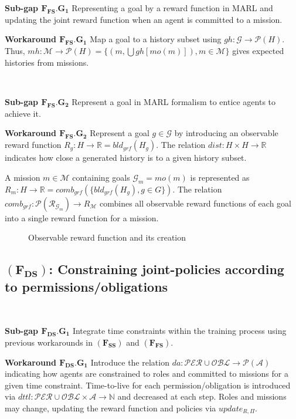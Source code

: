 \documentclass[conference]{IEEEtran}
\newcounter{relation}
\begin{document}
\textbf{Sub-gap $\mathbf{F_{FS}.G_1}$} \quad Representing a goal by a reward function in MARL and updating the joint reward function when an agent is committed to a mission.

\textbf{Workaround $\mathbf{F_{FS}.G_1}$} \quad Map a goal to a history subset using $gh: \mathcal{G} \rightarrow \mathcal{P}(H)$. Thus, $mh: \mathcal{M} \rightarrow \mathcal{P}(H) = \{(m,\bigcup gh[mo(m)]), m \in \mathcal{M}\}$ gives expected histories from missions.

\

\textbf{Sub-gap $\mathbf{F_{FS}.G_2}$} \quad Represent a goal in MARL formalism to entice agents to achieve it.

\textbf{Workaround $\mathbf{F_{FS}.G_2}$} \quad Represent a goal $g \in \mathcal{G}$ by introducing an observable reward function $R_{g}: H \rightarrow \mathbb{R} = bld_{grf}(H_g)$. The relation $dist: H \times H \rightarrow \mathbb{R}$ indicates how close a generated history is to a given history subset.

A mission $m \in \mathcal{M}$ containing goals $\mathcal{G}_{m} = mo(m)$ is represented as $R_m: H \rightarrow \mathbb{R} = comb_{grf}(\{bld_{grf}(H_g), g \in G\})$. The relation $comb_{grf}: \mathcal{P}(\mathcal{R}_{\mathcal{G}_{m}}) \rightarrow R_{\mathcal{M}}$ combines all observable reward functions of each goal into a single reward function for a mission.

\begin{figure}[h!]
    \centering
    
    \caption{Observable reward function and its creation}
    \label{fig:goal_mission_scheme}
\end{figure}

\subsection{\textbf{$(\mathbf{F_{DS}})$: Constraining joint-policies according to permissions/obligations}}

\

\textbf{Sub-gap $\mathbf{F_{DS}.G_1}$} \quad Integrate time constraints within the training process using previous workarounds in $(\mathbf{F_{SS}})$ and $(\mathbf{F_{FS}})$.

\textbf{Workaround $\mathbf{F_{DS}.G_1}$} \quad Introduce the relation $da: \mathcal{PER} \cup \mathcal{OBL} \rightarrow \mathcal{P}(\mathcal{A})$ indicating how agents are constrained to roles and committed to missions for a given time constraint. Time-to-live for each permission/obligation is introduced via $dttl: \mathcal{PER} \cup \mathcal{OBL} \times \mathcal{A} \rightarrow \mathbb{N}$ and decreased at each step. Roles and missions may change, updating the reward function and policies via $update_{R,\Pi}$.
\end{document}
